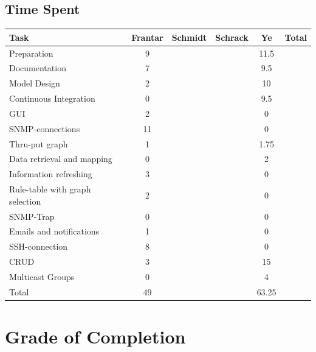 \documentclass[11pt, a4paper]{article}
\begin{document}
\subsection{Time Spent}
\begin{tabular} {| l | c | c | c | c | c |} \hline

	Task 								& 	Frantar 	& 	Schmidt 	& 	Schrack 	& 	Ye 		& 	Total 	\\ \hline \hline
	
	Preparation							& 	9			&				&				&	11.5	&			\\ \hline
	Documentation						&	7			&				&				&	9.5		&			\\ \hline
	Model Design						& 	2			&				&				& 	10		&			\\ \hline
	Continuous Integration				& 	0			& 				& 				&	9.5		&			\\ \hline \hline
		
	GUI									& 	2			&				&				& 	0		&			\\ \hline
	SNMP-connections					& 	11			&				&				& 	0		&			\\ \hline
	Thru-put graph						& 	1			&				&				& 	1.75	&			\\ \hline
	Data retrieval and mapping			& 	0			&				&				& 	2		&			\\ \hline
	Information refreshing				&	3			&				&				&	0		&			\\ \hline
	Rule-table with graph selection		&	2			&				&				&	0		&			\\ \hline \hline
	
	SNMP-Trap							&	0			&				&				&	0		&			\\ \hline
	Emails and notifications			&	1			&				&				&	0		&			\\ \hline
	SSH-connection						&	8			&				&				&	0		&			\\ \hline
	CRUD								& 	3			& 				& 				&	15		&			\\ \hline
	Multicast Groups					&	0			&				&				&	4		&			\\ \hline \hline
	
	Total								&	49			&				&				&	63.25	&			\\ \hline
	
\end{tabular}

\newpage


\section{Grade of Completion}
\end{document}
